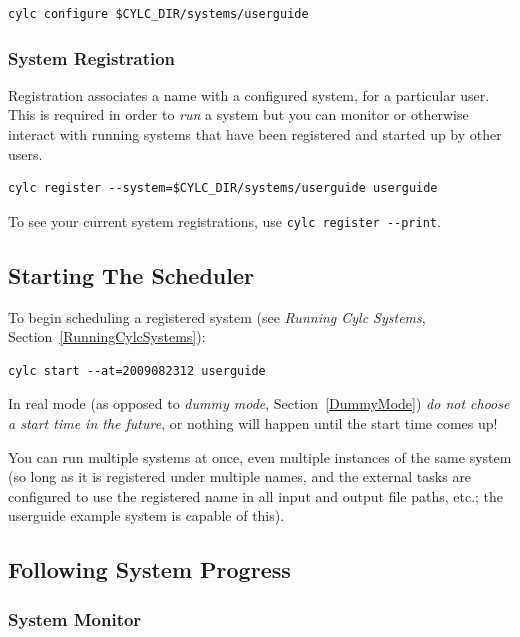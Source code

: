 \documentclass[11pt,a4paper]{article}
\begin{document}
\begin{lstlisting}
cylc configure $CYLC_DIR/systems/userguide
\end{lstlisting}

\subsubsection{System Registration}
\label{QuickSystemRegistration}

Registration associates a name with a configured system, for a
particular user. This is required in order to {\em run} a system but you
can monitor or otherwise interact with running systems that have been
registered and started up by other users.

\begin{lstlisting}
cylc register --system=$CYLC_DIR/systems/userguide userguide 
\end{lstlisting}

To see your current system registrations, use 
\lstinline=cylc register --print=.

\subsection{Starting The Scheduler}
\label{QuickStartingTheScheduler}

To begin scheduling a registered system (see {\em Running Cylc Systems},
Section~\ref{RunningCylcSystems}):

\begin{lstlisting}
cylc start --at=2009082312 userguide
\end{lstlisting}

In real mode (as opposed to {\em dummy mode}, Section~\ref{DummyMode})
{\em do not choose a start time in the future}, or nothing will happen
until the start time comes up!

You can run multiple systems at once, even multiple instances of the
same system (so long as it is registered under multiple names, and the
external tasks are configured to use the registered name in all input
and output file paths, etc.; the userguide example system is capable of
this). 

\subsection{Following System Progress}
\label{QuickFollowingSystemProgress}

\subsubsection{System Monitor}
\label{QuickSystemMonitor}
\end{document}
